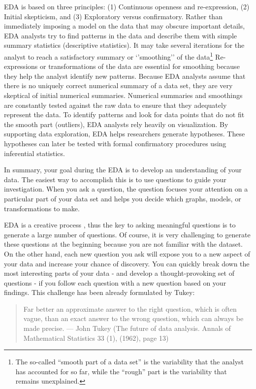\documentclass[
]{book}
\begin{document}
EDA is based on three principles: (1) Continuous openness and re-expression, (2) Initial skepticism, and (3) Exploratory versus confirmatory. Rather than immediately imposing a model on the data that may obscure important details, EDA analysts try to find patterns in the data and describe them with simple summary statistics (descriptive statistics). It may take several iterations for the analyst to reach a satisfactory summary or `'smoothing'' of the data\footnote{The so-called ``smooth part of a data set'' is the variability that the analyst has accounted for so far, while the ``rough'' part is the variability that remains unexplained.} Re-expressions or transformations of the data are essential for smoothing because they help the analyst identify new patterns.
Because EDA analysts assume that there is no uniquely correct numerical summary of a data set, they are very skeptical of initial numerical summaries. Numerical summaries and smoothings are constantly tested against the raw data to ensure that they adequately represent the data. To identify patterns and look for data points that do not fit the smooth part (outliers), EDA analysts rely heavily on visualization.
By supporting data exploration, EDA helps researchers generate hypotheses. These hypotheses can later be tested with formal confirmatory procedures using inferential statistics.

In summary, your goal during the EDA is to develop an understanding of your data. The easiest way to accomplish this is to use questions to guide your investigation. When you ask a question, the question focuses your attention on a particular part of your data set and helps you decide which graphs, models, or transformations to make.

EDA is a creative process \citep{WickhamGrolemund2017Rfordatascience}, thus the key to asking meaningful questions is to generate a large number of questions. Of course, it is very challenging to generate these questions at the beginning because you are not familiar with the dataset. On the other hand, each new question you ask will expose you to a new aspect of your data and increase your chance of discovery. You can quickly break down the most interesting parts of your data - and develop a thought-provoking set of questions - if you follow each question with a new question based on your findings. This challenge has been already formulated by Tukey:

\begin{quote}
Far better an approximate answer to the right question, which is often vague, than an exact answer to the wrong question,
which can always be made precise.
--- John Tukey (The future of data analysis. Annals of Mathematical Statistics 33 (1), (1962), page 13)
\end{quote}
\end{document}
